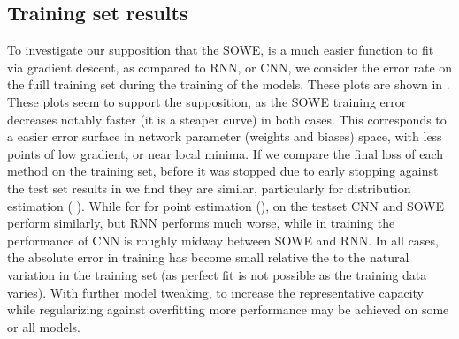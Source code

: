 \documentclass[11pt,a4paper]{article}
\begin{document}
\subsection{Training set results}

To investigate our supposition that the SOWE, is a much easier function to fit via gradient descent, as compared to RNN, or CNN, we consider the error rate on the fuill training set during the training of the models.
These plots are shown in .
These plots seem to support the supposition, as the SOWE training error decreases notably faster (it is a steaper curve) in both cases.
This corresponds to a easier error surface in network parameter (weights and biases) space, with less points of low gradient, or near local minima.
If we compare the final loss of each method on the training set, before it was stopped due to early stopping against the test set results in  
we find they are similar,  particularly for distribution estimation ( ).
While for for point estimation (), on the testset CNN and SOWE perform similarly, but RNN performs much worse, while in training the performance of CNN is roughly midway between SOWE and RNN.
In all cases, the absolute error in training has become small relative the to the natural variation in the training set (as perfect fit is not possible as the training data varies).
With further model tweaking, to increase the representative capacity while regularizing against overfitting more performance may be achieved on some or all models.




\end{document}
